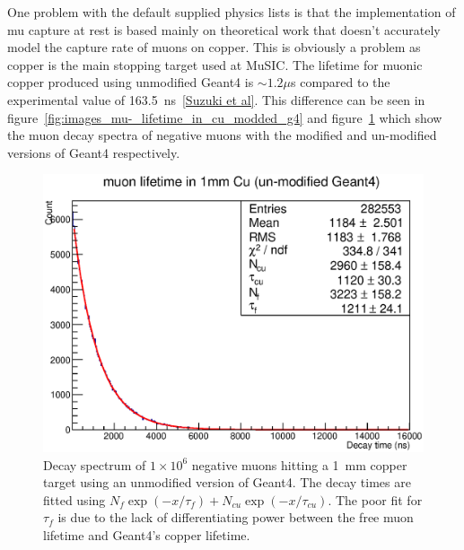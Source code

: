 One problem with the default supplied physics lists is that the implementation of mu capture at rest is based mainly on theoretical work that doesn't accurately model the capture rate of muons on copper. This is obviously a problem as copper is the main stopping target used at MuSIC. The lifetime for muonic copper produced using unmodified Geant4 is \(\sim1.2\mu\)s compared to the experimental value of 163.5~ns~\ref{Suzuki et al}. This difference can be seen in figure~\ref{fig:images_mu-_lifetime_in_cu_modded_g4} and figure~\ref{fig:images_mu-_lifetime_in_cu_unmodded_g4} which show the muon decay spectra of negative muons with the modified and un-modified versions of Geant4 respectively. 
\begin{figure}[hptb]
  \centering
    \includegraphics[width=.9\textwidth]{images/mu-_lifetime_in_cu_unmodded_g4.eps}
  \caption{Decay spectrum of \(1\times10^6\) negative muons hitting a 1~mm copper target using an unmodified version of Geant4. The decay times are fitted using \(N_f\exp(-x/\tau_f) +  N_{cu}\exp(-x/\tau_{cu})\). The poor fit for \(\tau_f\) is due to the lack of differentiating power between the free muon lifetime and Geant4's copper lifetime.}
  \label{fig:images_mu-_lifetime_in_cu_unmodded_g4}
\end{figure}

